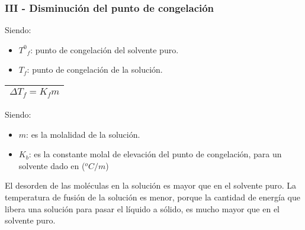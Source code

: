         \subsubsection{III - Disminución del punto de congelación}
        Siendo:
        \begin{itemize}
            \item ${T^0}_{f}$: punto de congelación del solvente puro.
            \item $T_f$: punto de congelación de la solución.
        \end{itemize}
        \begin{center}
            \begin{tabular}{|m{5cm}|}
                \toprule
                \multicolumn{1}{|c|}{$\Delta T_f = K_f m$} \\
                \bottomrule
            \end{tabular}
        \end{center}
        Siendo:
        \begin{itemize}
            \item $m$: es la molalidad de la solución.
            \item $K_b$: es la constante molal de elevación del punto de congelación, para un solvente dado en ($\text{}^oC/m$)
        \end{itemize}
        \sangria{} El desorden de las moléculas en la solución es mayor que en el solvente puro. La temperatura de fusión de la solución es menor, porque la cantidad de energía que libera una solución para pasar el líquido a sólido, es mucho mayor que en el solvente puro.
        \saltoPag{}
